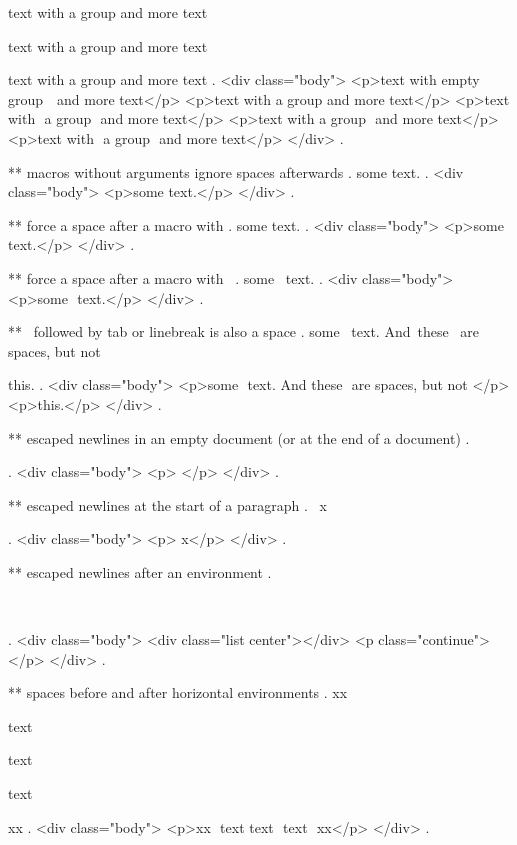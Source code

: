 text with { a group } and more text

text with { a group  } and more text

text with {  a group  }  and more text
.
<div class="body">
<p>text with empty group ​ ​ and more text</p>
<p>text with a group​ and more text</p>
<p>text with ​ a group ​ and more text</p>
<p>text with ​ a group ​ and more text</p>
<p>text with ​ a group ​ and more text</p>
</div>
.


** macros without arguments ignore spaces afterwards
.
some \empty  text.
.
<div class="body">
<p>some text.</p>
</div>
.


** force a space after a macro with {}
.
some \empty{} text.
.
<div class="body">
<p>some ​ text.</p>
</div>
.


** force a space after a macro with \
.
some \empty\ text.
.
<div class="body">
<p>some ​ text.</p>
</div>
.


** \ followed by tab or linebreak is also a space
.
some \empty\
text. And\	these
\
are spaces, but not\

this.
.
<div class="body">
<p>some ​ text. And​ these ​ are spaces, but not​ </p>
<p>this.</p>
</div>
.


** escaped newlines in an empty document (or at the end of a document)
.
\


.
<div class="body">
<p>​ </p>
</div>
.


** escaped newlines at the start of a paragraph
.
\
x

.
<div class="body">
<p>​ x</p>
</div>
.


** escaped newlines after an environment
.
\begin{center}
\end{center}
\

.
<div class="body">
<div class="list center"></div>
<p class="continue">​ </p>
</div>
.


** spaces before and after horizontal environments
.
xx
\begin{empty}
  text\begin{empty}
    text
  \end{empty}
  \begin{empty}text
  \end{empty}
\end{empty}
xx
.
<div class="body">
<p>xx ​ text​ text ​ text ​ ​ xx</p>
</div>
.